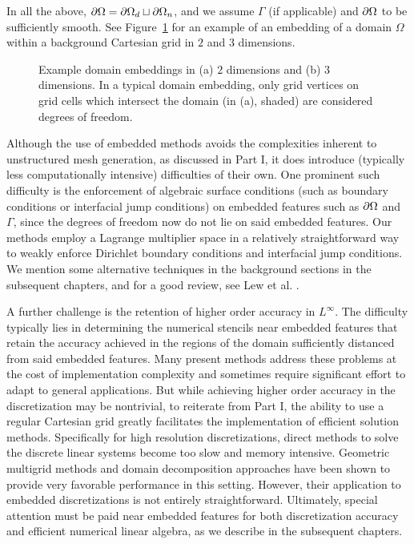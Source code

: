 In all the above, $\partial\Omega = \partial\Omega_d \sqcup \partial\Omega_n$, and we assume $\Gamma$ (if applicable) and $\partial\Omega$ to be sufficiently smooth. See Figure~\ref{fig:pt2.embedding} for an example of an embedding of a domain $\Omega$ within a background Cartesian grid in $2$ and $3$ dimensions.

\setlength{\figureheight}{0.40\columnwidth}
\begin{figure}[htbp]
\begin{center}
\caption{Example domain embeddings in (a) $2$ dimensions and (b) $3$ dimensions. In a typical domain embedding, only grid vertices on grid cells which intersect the domain (in (a), shaded) are considered degrees of freedom.}
\label{fig:pt2.embedding}
\end{center}
\end{figure}

Although the use of embedded methods avoids the complexities inherent to unstructured mesh generation, as discussed in Part I, it does introduce (typically less computationally intensive) difficulties of their own. One prominent such difficulty is the enforcement of algebraic surface conditions (such as boundary conditions or interfacial jump conditions) on embedded features such as $\partial\Omega$ and $\Gamma$, since the degrees of freedom now do not lie on said embedded features. Our methods employ a Lagrange multiplier space in a relatively straightforward way to weakly enforce Dirichlet boundary conditions and interfacial jump conditions. We mention some alternative techniques in the background sections in the subsequent chapters, and for a good review, see Lew et al. \cite{Lew.Adrian08}.

A further challenge is the retention of higher order accuracy in $L^{\infty}$. The difficulty typically lies in determining the numerical stencils near embedded features that retain the accuracy achieved in the regions of the domain sufficiently distanced from said embedded features. Many present methods address these problems at the cost of implementation complexity and sometimes require significant effort to adapt to general applications. But while achieving higher order accuracy in the discretization may be nontrivial, to reiterate from Part I, the ability to use a regular Cartesian grid greatly facilitates the implementation of efficient solution methods. Specifically for high resolution discretizations, direct methods to solve the discrete linear systems become too slow and memory intensive. Geometric multigrid methods and domain decomposition approaches have been shown to provide very favorable performance in this setting. However, their application to embedded discretizations is not entirely straightforward. Ultimately, special attention must be paid near embedded features for both discretization accuracy and efficient numerical linear algebra, as we describe in the subsequent chapters.

